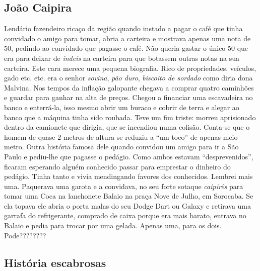 \documentclass[12pt,brazil,]{book}
\begin{document}
\subsection{João Caipira}\label{jouxe3o-caipira}

Lendário fazendeiro ricaço da região quando instado a pagar o café que
tinha convidado o amigo para tomar, abria a carteira e mostrava apenas
uma nota de 50, pedindo ao convidado que pagasse o café. Não queria
gastar o único 50 que era para deixar de \emph{indeis} na carteira para
que botassem outras notas na sua carteira. Este cara merece uma pequena
biografia. Rico de propriedades, veículos, gado etc. etc. era o senhor
\emph{sovina}, \emph{pão duro}, \emph{biscoito de sordado} como diria
dona Malvina. Nos tempos da inflação galopante chegava a comprar quatro
caminhões e guardar para ganhar na alta de preços. Chegou a financiar
uma escavadeira no banco e enterrá-la, isso mesmo abrir um buraco e
cobrir de terra e alegar ao banco que a máquina tinha sido roubada. Teve
um fim triste: morreu aprisionado dentro da camionete que dirigia, que
se incendiou numa colisão. Conta-se que o homem de quase 2 metros de
altura se reduziu a ``um toco'' de apenas meio metro. Outra história
famosa dele quando convidou um amigo para ir a São Paulo e pediu-lhe que
pagasse o pedágio. Como ambos estavam ``desprevenidos'', ficaram
esperando alguém conhecido passar para emprestar o dinheiro do pedágio.
Tinha tanto e vivia mendingando favores dos conhecidos. Lembrei mais
uma. Paquerava uma garota e a convidava, no seu forte sotaque
\emph{caipirês} para tomar uma Coca na lanchonete Balaio na praça Nove
de Julho, em Sorocaba. Se ela topava ele abria o porta malas do seu
Dodge Dart ou Galaxy e retirava uma garrafa do refrigerante, comprado de
caixa porque era mais barato, entrava no Balaio e pedia para trocar por
uma gelada. Apenas uma, para os dois. Pode????????

\subsection{História escabrosas}\label{histuxf3ria-escabrosas}
\end{document}
